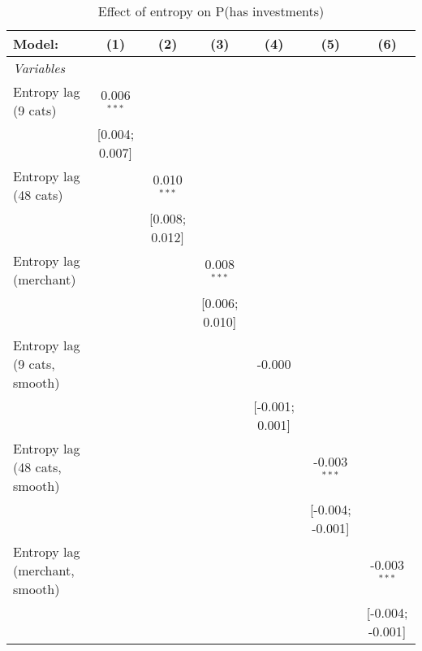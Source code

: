 
\begin{table}[htbp]
   \centering
   \tiny
   \begin{threeparttable}[b]
      \caption{\label{tab:reg_has_investments_lag} Effect of entropy on P(has investments)}
      \begin{tabular}{lcccccc}
         \tabularnewline \midrule \midrule
         Model:                         & (1)            & (2)            & (3)            & (4)             & (5)              & (6)\\  
         \midrule
         \emph{Variables}\\
         Entropy lag (9 cats)           & 0.006$^{***}$  &                &                &                 &                  &   \\   
                                        & [0.004; 0.007] &                &                &                 &                  &   \\   
         Entropy lag (48 cats)          &                & 0.010$^{***}$  &                &                 &                  &   \\   
                                        &                & [0.008; 0.012] &                &                 &                  &   \\   
         Entropy lag (merchant)         &                &                & 0.008$^{***}$  &                 &                  &   \\   
                                        &                &                & [0.006; 0.010] &                 &                  &   \\   
         Entropy lag (9 cats, smooth)   &                &                &                & -0.000          &                  &   \\   
                                        &                &                &                & [-0.001; 0.001] &                  &   \\   
         Entropy lag (48 cats, smooth)  &                &                &                &                 & -0.003$^{***}$   &   \\   
                                        &                &                &                &                 & [-0.004; -0.001] &   \\   
         Entropy lag (merchant, smooth) &                &                &                &                 &                  & -0.003$^{***}$\\   
                                        &                &                &                &                 &                  & [-0.004; -0.001]\\   

\end{tabular}
\end{threeparttable}
\end{table}
